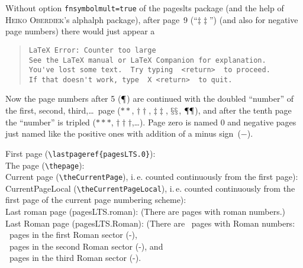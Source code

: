 \documentclass[british]{article}
\begin{document}
Without option \texttt{fnsymbolmult=true} of the \textsf{pageslts} package
(and the help of \textsc{Heiko Oberdiek}'s \textsf{alphalph} package),
after page~9 (\textquotedblleft \ensuremath {\ddagger \ddagger }\textquotedblright )
(and also for negative page numbers) there would just appear a
\begin{quote}
\begin{verbatim}
LaTeX Error: Counter too large
See the LaTeX manual or LaTeX Companion for explanation.
You've lost some text.  Try typing  <return>  to proceed.
If that doesn't work, type  X <return>  to quit.
\end{verbatim}
\end{quote}
Now the page numbers after 5 (\ensuremath {\mathparagraph }) are
continued  with the doubled \textquotedblleft number\textquotedblright{} of
the first, second, third,\ldots\ page (\ensuremath {**},
\ensuremath {\dagger \dagger }, \ensuremath {\ddagger \ddagger },
\ensuremath {\mathsection \mathsection },
\ensuremath {\mathparagraph \mathparagraph }),
and after the tenth page the \textquotedblleft number\textquotedblright{} is
tripled (\ensuremath {***}, \ensuremath {\dagger \dagger \dagger },\ldots).
Page zero is named 0 and negative pages just named like the positive ones
with addition of a minus sign~($-$).

\bigskip

\noindent First page (\verb|\lastpageref{pagesLTS.0}|):
\\

\noindent The page (\verb|\thepage|): \thepage \\

\noindent Current page (\verb|\theCurrentPage|),
i.\,e. counted continuously from the first page): \theCurrentPage \\

\noindent CurrentPageLocal (\verb|\theCurrentPageLocal|),
i.\,e. counted continuously from the first page of the
current page numbering scheme): \theCurrentPageLocal \\

\noindent Last roman page (pagesLTS.roman): 
(There are  pages with roman numbers.)\\

\noindent Last Roman page (pagesLTS.Roman): 
(There are ~pages with Roman numbers:\\
~pages in the first Roman sector
(\pageref{Roman}{\hskip3em }-),\\
~pages in the second Roman sector
(\pageref{Roman2}{\hskip3em }-), and\\
~pages in the third Roman sector
(\pageref{Roman3}{\hskip3em }-).\\
\end{document}
